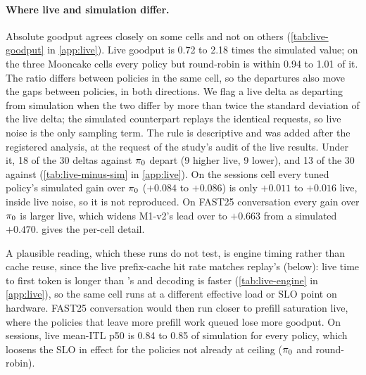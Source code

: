 \paragraph{Where live and simulation differ.}
Absolute goodput agrees closely on some cells and not on others (\cref{tab:live-goodput} in
\cref{app:live}). Live
goodput is 0.72 to 2.18 times the simulated value; on the three Mooncake cells every policy but
round-robin is within 0.94 to 1.01 of it. The ratio differs between policies in the same cell, so the
departures also move the gaps between policies, in both directions. We flag a live delta as
departing from simulation when the two differ by more than twice the standard deviation of the live
delta; the simulated counterpart replays the identical requests, so live noise is the only sampling
term. The rule is descriptive and was added after the registered analysis, at the request of the
study's audit of the live results. Under it, 18 of the 30 deltas against $\pi_{0}$ depart (9
higher live, 9 lower), and 13 of the 30 against  (\cref{tab:live-minus-sim} in
\cref{app:live}).
On the sessions cell every tuned policy's simulated gain over $\pi_{0}$ ($+0.084$ to $+0.086$) is only
$+0.011$ to $+0.016$ live, inside live noise, so it is not reproduced. On FAST25 conversation every
gain over $\pi_{0}$ is larger live, which widens M1-v2's lead over  to $+0.663$ from a
simulated $+0.470$.  gives the per-cell detail.

A plausible reading, which these runs do not test, is engine timing rather than cache reuse, since
the live prefix-cache hit rate matches replay's (below): live time to first token is longer than
\ais{}'s and decoding is faster (\cref{tab:live-engine} in \cref{app:live}), so the same cell runs at a different
effective load or SLO point on hardware. FAST25 conversation would then run closer to prefill
saturation live, where the policies that leave more prefill work queued lose more goodput. On
sessions, live mean-ITL p50 is 0.84 to 0.85 of simulation for every policy, which loosens the SLO in
effect for the policies not already at ceiling ($\pi_{0}$ and round-robin).

